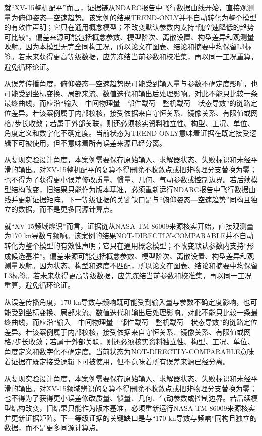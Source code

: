 \documentclass[UTF8,12pt,openany]{ctexbook}
\begin{document}
就“XV-15整机配平”而言，证据链从NDARC报告中飞行数据曲线开始，直接观测量为俯仰姿态—空速趋势。该案例的结果TREND-ONLY并不自动转化为整个模型的有效性声明；它只在通用概念模型；不改变默认参数内支持“随空速降低的趋势可比较”。偏差来源可能包括概念参数、模型阶次、离散设置、构型差异和观测量映射。因为本模型无完全同构工况，所以论文在图表、结论和摘要中均保留L3标签。若未来获得更高等级数据，应先冻结当前参数和校准集，再以同一工况重算，避免循环论证。

从误差传播角度，俯仰姿态—空速趋势既可能受到输入量与参数不确定度影响，也可能受到坐标变换、局部来流、数值迭代和输出后处理影响。对此不能只比较一条最终曲线，而应沿“输入—中间物理量—部件载荷—整机载荷—状态导数”的链路定位差异。若该案例属于内部校核，接受依据来自守恒关系、镜像关系、有限值或网格/步长收敛；若属于外部关联，则还必须核实资料独立性、构型、工况、单位、角度定义和数字化不确定度。当前状态为TREND-ONLY意味着证据在既定接受逻辑下可被使用，但不意味着所有误差来源已经分离。

从复现实验设计角度，本案例需要保存原始输入、求解器状态、失败标识和未经平滑的输出。对XV-15整机配平的复算不得删除不收敛点或把非物理分支替换为零；也不得为了获得更小误差修改质量、惯量、几何、气动参数或控制边界。若后续模型结构改变，旧结果只能作为版本基准，必须重新运行NDARC报告中飞行数据曲线并更新证据矩阵。下一等级证据的关键缺口是与“俯仰姿态—空速趋势”同构且独立的数据，而不是更多同源计算点。

就“XV-15频域辨识”而言，证据链从NASA TM-86009来源核实开始，直接观测量为170 kn导数与频响。该案例的结果NOT-DIRECTLY-COMPARABLE并不自动转化为整个模型的有效性声明；它只在通用概念模型；不改变默认参数内支持“形成候选基准”。偏差来源可能包括概念参数、模型阶次、离散设置、构型差异和观测量映射。因为状态、构型和速度不匹配，所以论文在图表、结论和摘要中均保留L3标签。若未来获得更高等级数据，应先冻结当前参数和校准集，再以同一工况重算，避免循环论证。

从误差传播角度，170 kn导数与频响既可能受到输入量与参数不确定度影响，也可能受到坐标变换、局部来流、数值迭代和输出后处理影响。对此不能只比较一条最终曲线，而应沿“输入—中间物理量—部件载荷—整机载荷—状态导数”的链路定位差异。若该案例属于内部校核，接受依据来自守恒关系、镜像关系、有限值或网格/步长收敛；若属于外部关联，则还必须核实资料独立性、构型、工况、单位、角度定义和数字化不确定度。当前状态为NOT-DIRECTLY-COMPARABLE意味着证据在既定接受逻辑下可被使用，但不意味着所有误差来源已经分离。

从复现实验设计角度，本案例需要保存原始输入、求解器状态、失败标识和未经平滑的输出。对XV-15频域辨识的复算不得删除不收敛点或把非物理分支替换为零；也不得为了获得更小误差修改质量、惯量、几何、气动参数或控制边界。若后续模型结构改变，旧结果只能作为版本基准，必须重新运行NASA TM-86009来源核实并更新证据矩阵。下一等级证据的关键缺口是与“170 kn导数与频响”同构且独立的数据，而不是更多同源计算点。
\end{document}
